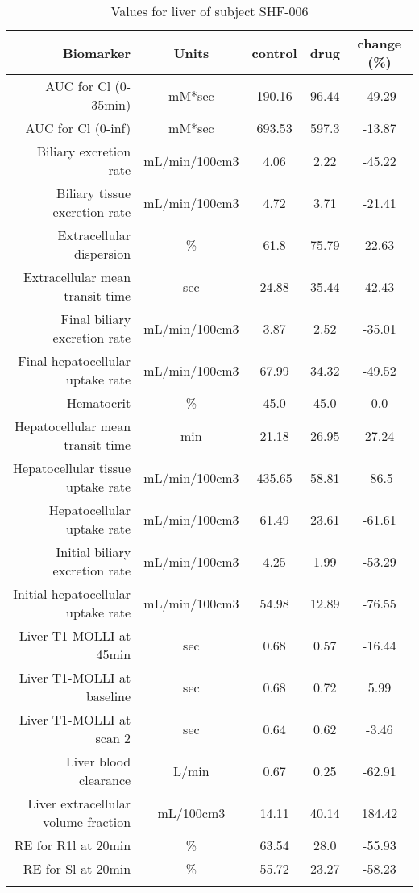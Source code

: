 \documentclass{epflreport}%
\begin{document}
%
\clearpage%
\begin{longtable}{rcccc}%
\hline%
Biomarker&Units&control&drug&change (\%)\\%
\hline%
AUC for Cl (0{-}35min)&mM*sec&190.16&96.44&{-}49.29\\%
AUC for Cl (0{-}inf)&mM*sec&693.53&597.3&{-}13.87\\%
Biliary excretion rate&mL/min/100cm3&4.06&2.22&{-}45.22\\%
Biliary tissue excretion rate&mL/min/100cm3&4.72&3.71&{-}21.41\\%
Extracellular dispersion&\%&61.8&75.79&22.63\\%
Extracellular mean transit time&sec&24.88&35.44&42.43\\%
Final biliary excretion rate&mL/min/100cm3&3.87&2.52&{-}35.01\\%
Final hepatocellular uptake rate&mL/min/100cm3&67.99&34.32&{-}49.52\\%
Hematocrit&\%&45.0&45.0&0.0\\%
Hepatocellular mean transit time&min&21.18&26.95&27.24\\%
Hepatocellular tissue uptake rate&mL/min/100cm3&435.65&58.81&{-}86.5\\%
Hepatocellular uptake rate&mL/min/100cm3&61.49&23.61&{-}61.61\\%
Initial biliary excretion rate&mL/min/100cm3&4.25&1.99&{-}53.29\\%
Initial hepatocellular uptake rate&mL/min/100cm3&54.98&12.89&{-}76.55\\%
Liver T1{-}MOLLI at 45min&sec&0.68&0.57&{-}16.44\\%
Liver T1{-}MOLLI at baseline&sec&0.68&0.72&5.99\\%
Liver T1{-}MOLLI at scan 2&sec&0.64&0.62&{-}3.46\\%
Liver blood clearance&L/min&0.67&0.25&{-}62.91\\%
Liver extracellular volume fraction&mL/100cm3&14.11&40.14&184.42\\%
RE for R1l at 20min&\%&63.54&28.0&{-}55.93\\%
RE for Sl at 20min&\%&55.72&23.27&{-}58.23\\%
\hline%
\caption{Values for liver of subject SHF-006} \\%
\end{longtable}%
\end{document}
